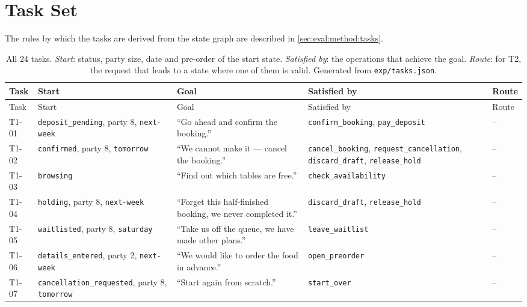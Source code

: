 \clearpage

\section{Task Set}\label{app:tasks}

The rules by which the tasks are derived from the state graph are described in \autoref{sec:eval:method:tasks}.

{\footnotesize
\begin{longtable}{@{}lP{0.19\textwidth}P{0.24\textwidth}P{0.2\textwidth}P{0.15\textwidth}@{}}
\caption{All 24 tasks. \emph{Start}: status, party size, date and pre-order of the start state. \emph{Satisfied by}: the operations that achieve the goal. \emph{Route}: for T2, the request that leads to a state where one of them is valid. Generated from \texttt{exp/tasks.json}.}
\label{tab:app:tasks} \\
\hline
Task & Start & Goal & Satisfied by & Route \\
\hline
\endfirsthead
\hline
Task & Start & Goal & Satisfied by & Route \\
\hline
\endhead
\hline
\endfoot
T1-01 & \texttt{deposit\_\allowbreak{}pending}, party 8, \texttt{next-week} & ``Go ahead and confirm the booking.'' & \texttt{confirm\_\allowbreak{}booking}, \texttt{pay\_\allowbreak{}deposit} & -- \\
T1-02 & \texttt{confirmed}, party 8, \texttt{tomorrow} & ``We cannot make it — cancel the booking.'' & \texttt{cancel\_\allowbreak{}booking}, \texttt{request\_\allowbreak{}cancellation}, \texttt{discard\_\allowbreak{}draft}, \texttt{release\_\allowbreak{}hold} & -- \\
T1-03 & \texttt{browsing} & ``Find out which tables are free.'' & \texttt{check\_\allowbreak{}availability} & -- \\
T1-04 & \texttt{holding}, party 8, \texttt{next-week} & ``Forget this half-finished booking, we never completed it.'' & \texttt{discard\_\allowbreak{}draft}, \texttt{release\_\allowbreak{}hold} & -- \\
T1-05 & \texttt{waitlisted}, party 8, \texttt{saturday} & ``Take us off the queue, we have made other plans.'' & \texttt{leave\_\allowbreak{}waitlist} & -- \\
T1-06 & \texttt{details\_\allowbreak{}entered}, party 2, \texttt{next-week} & ``We would like to order the food in advance.'' & \texttt{open\_\allowbreak{}preorder} & -- \\
T1-07 & \texttt{cancellation\_\allowbreak{}requested}, party 8, \texttt{tomorrow} & ``Start again from scratch.'' & \texttt{start\_\allowbreak{}over} & -- \\

\end{longtable}}

